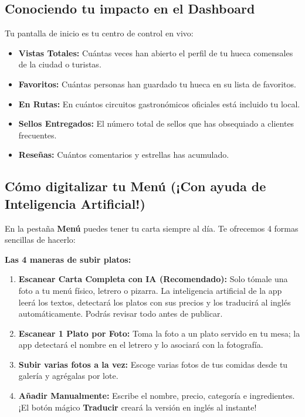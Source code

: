 \documentclass[11pt, a4paper, oneside]{article}
\begin{document}
\subsection{Conociendo tu impacto en el Dashboard}
Tu pantalla de inicio es tu centro de control en vivo:
\begin{itemize}
  \item \textbf{Vistas Totales:} Cuántas veces han abierto el perfil de tu hueca comensales de la ciudad o turistas.
  \item \textbf{Favoritos:} Cuántas personas han guardado tu hueca en su lista de favoritos.
  \item \textbf{En Rutas:} En cuántos circuitos gastronómicos oficiales está incluido tu local.
  \item \textbf{Sellos Entregados:} El número total de sellos que has obsequiado a clientes frecuentes.
  \item \textbf{Reseñas:} Cuántos comentarios y estrellas has acumulado.
\end{itemize}

\subsection{Cómo digitalizar tu Menú (¡Con ayuda de Inteligencia Artificial!)}
En la pestaña \textbf{Menú} puedes tener tu carta siempre al día. Te ofrecemos 4 formas sencillas de hacerlo:

\begin{stepbox}
\textbf{Las 4 maneras de subir platos:}
\begin{enumerate}
  \item \textbf{Escanear Carta Completa con IA (Recomendado):} Solo tómale una foto a tu menú físico, letrero o pizarra. La inteligencia artificial de la app leerá los textos, detectará los platos con sus precios y los traducirá al inglés automáticamente. Podrás revisar todo antes de publicar.
  \item \textbf{Escanear 1 Plato por Foto:} Toma la foto a un plato servido en tu mesa; la app detectará el nombre en el letrero y lo asociará con la fotografía.
  \item \textbf{Subir varias fotos a la vez:} Escoge varias fotos de tus comidas desde tu galería y agrégalas por lote.
  \item \textbf{Añadir Manualmente:} Escribe el nombre, precio, categoría e ingredientes. ¡El botón mágico \textbf{Traducir} creará la versión en inglés al instante!
\end{enumerate}
\end{stepbox}
\end{document}
